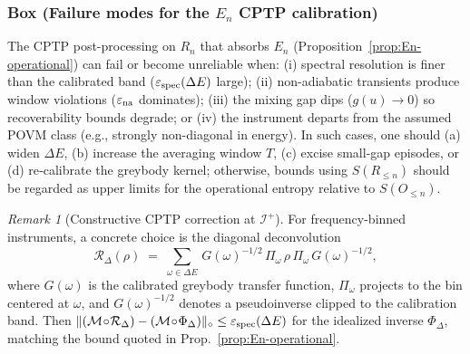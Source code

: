 \documentclass[aps,prd,preprint,onecolumn,superscriptaddress,nofootinbib,longbibliography,floatfix,11pt,showpacs,showkeys]{revtex4-2}
\theoremstyle{plain}
\theoremstyle{definition}
\theoremstyle{remark}
\newtheorem{remark}[theorem]{Remark}
\begin{document}
\subsubsection{Box (Failure modes for the $E_n$ CPTP calibration)}
The CPTP post-processing on $R_n$ that absorbs $E_n$ (Proposition~\ref{prop:En-operational}) can fail or become
unreliable when: (i) spectral resolution is finer than the calibrated band
($\varepsilon_{\rm spec}(\Delta E)$ large); (ii) non-adiabatic transients produce window
violations ($\varepsilon_{\rm na}$ dominates); (iii) the mixing gap dips ($g(u)\!\to\!0$)
so recoverability bounds degrade; or (iv) the instrument departs from the assumed POVM
class (e.g., strongly non-diagonal in energy). In such cases, one should (a) widen $\Delta E$,
(b) increase the averaging window $T$, (c) excise small-gap episodes, or (d) re‑calibrate
the greybody kernel; otherwise, bounds using $S(R_{\le n})$ should be regarded as upper
limits for the operational entropy relative to $S(O_{\le n})$.

\begin{remark}[Constructive CPTP correction at $\mathscr{I}^+$]
For frequency-binned instruments, a concrete choice is the diagonal deconvolution
\[
\mathcal{R}_\Delta(\rho)\;=\;\sum_{\omega\in\Delta E}\, G(\omega)^{-1/2}\,\Pi_\omega\,\rho\,\Pi_\omega\,G(\omega)^{-1/2},
\]
where $G(\omega)$ is the calibrated greybody transfer function, $\Pi_\omega$ projects to the bin centered at $\omega$, and $G(\omega)^{-1/2}$ denotes a pseudoinverse clipped to the calibration band. Then $\|(\mathcal{M}\!\circ\!\mathcal{R}_\Delta)-(\mathcal{M}\!\circ\!\Phi_\Delta)\|_\diamond\le \varepsilon_{\rm spec}(\Delta E)$ for the idealized inverse $\Phi_\Delta$, matching the bound quoted in Prop.~\ref{prop:En-operational}.
\end{remark}
\end{document}
